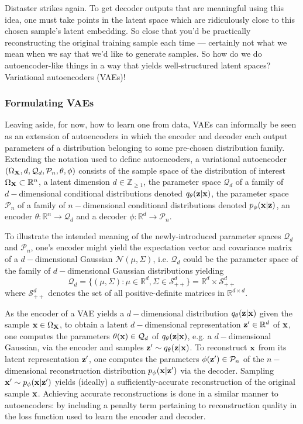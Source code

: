 \documentclass[11pt]{article}
\begin{document}
\noindent Distaster strikes again. To get decoder outputs that are meaningful using this idea, one must take points in the latent space which are ridiculously close to this chosen sample's latent embedding. So close that you'd be practically reconstructing the original training sample each time — certainly not what we mean when we say that we'd like to generate samples. So how do we do autoencoder-like things in a way that yields well-structured latent spaces? Variational autoencoders (VAEs)!

\subsubsection{Formulating VAEs}
Leaving aside, for now, how to learn one from data, VAEs can informally be seen as an extension of autoencoders in which the encoder and decoder each output parameters of a distribution belonging to some pre-chosen distribution family. Extending the notation used to define autoencoders, a variational autoencoder $(\Omega_{\mathbf{X}},d,\mathcal{Q}_d,\mathcal{P}_n,\theta,\phi)$ consists of the sample space of the distribution of interest $\Omega_{\mathbf{X}}\subset\mathbb{R}^n$, a latent dimension $d\in\mathbb{Z}_{\geq1}$, the parameter space $\mathcal{Q}_d$ of a family of $d-$dimensional conditional distributions denoted $q_{\theta}(\mathbf{z}|\mathbf{x})$, the parameter space $\mathcal{P}_n$ of a family of $n-$dimensional conditional distributions denoted $p_{\phi}(\mathbf{x}|\mathbf{z})$, an encoder $\theta:\mathbb{R}^n\to\mathcal{Q}_d$ and a decoder $\phi:\mathbb{R}^d\to\mathcal{P}_n$.

To illustrate the intended meaning of the newly-introduced parameter spaces $\mathcal{Q}_d$ and $\mathcal{P}_n$, one's encoder might yield the expectation vector and covariance matrix of a $d-$dimensional Gaussian $\mathcal{N}(\mu,\Sigma)$, i.e. $\mathcal{Q}_d$ could be the parameter space of the family of $d-$dimensional Gaussian distributions yielding
$$
\mathcal{Q}_d
=
\{
(\mu,\Sigma):\mu\in\mathbb{R}^d, \Sigma\in\mathcal{S}_{++}^d
\}
=
\mathbb{R}^d\times\mathcal{S}_{++}^d
$$
where $\mathcal{S}_{++}^d$ denotes the set of all positive-definite matrices in $\mathbb{R}^{d\times d}$.

As the encoder of a VAE yields a $d-$dimensional distribution $q_{\theta}(\mathbf{z}|\mathbf{x})$ given the sample $\mathbf{x}\in\Omega_{\mathbf{X}}$, to obtain a latent $d-$dimensional representation $\mathbf{z}'\in\mathbb{R}^d$ of $\mathbf{x}$, one computes the parameters $\theta(\mathbf{x})\in\mathcal{Q}_d$ of $q_{\theta}(\mathbf{z}|\mathbf{x})$, e.g. a $d-$dimensional Gaussian, via the encoder and samples $\mathbf{z}'\sim q_{\theta}(\mathbf{z}|\mathbf{x})$. To reconstruct $\mathbf{x}$ from its latent representation $\mathbf{z}'$, one computes the parameters $\phi(\mathbf{z}')\in\mathcal{P}_n$ of the $n-$dimensional reconstruction distribution $p_{\phi}(\mathbf{x}|\mathbf{z}')$ via the decoder. Sampling $\mathbf{x}'\sim p_{\phi}(\mathbf{x}|\mathbf{z}')$ yields (ideally) a sufficiently-accurate reconstruction of the original sample $\mathbf{x}$. Achieving accurate reconstructions is done in a similar manner to autoencoders: by including a penalty term pertaining to reconstruction quality in the loss function used to learn the encoder and decoder.
\end{document}
